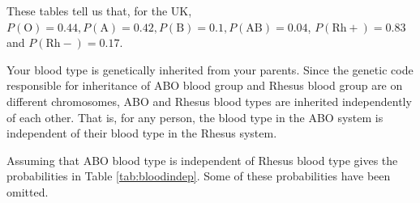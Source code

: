 \documentclass[
  11pt,
  british,
  openany, a4paper]{book}
\begin{document}
These tables tell us that, for the UK, \(P(\mbox{O})=0.44, P(\mbox{A})=0.42, P(\mbox{B})=0.1, P(\mbox{AB})=0.04\), \(P(\mbox{Rh}+)=0.83\) and \(P(\mbox{Rh}-)=0.17\).

Your blood type is genetically inherited from your parents. Since the genetic code responsible for inheritance of ABO blood group and Rhesus blood group are on different chromosomes, ABO and Rhesus blood types are inherited independently of each other. That is, for any person, the blood type in the ABO system is independent of their blood type in the Rhesus system.

Assuming that ABO blood type is independent of Rhesus blood type gives the probabilities in Table \ref{tab:bloodindep}. Some of these probabilities have been omitted.

 
  \providecommand{\huxb}[2]{\arrayrulecolor[RGB]{#1}\global\arrayrulewidth=#2pt}
  \providecommand{\huxvb}[2]{\color[RGB]{#1}\vrule width #2pt}
  \providecommand{\huxtpad}[1]{\rule{0pt}{#1}}
  \providecommand{\huxbpad}[1]{\rule[-#1]{0pt}{#1}}
\end{document}
